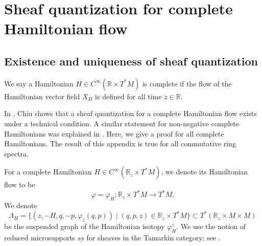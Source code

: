 \documentclass[11pt]{amsart}
\numberwithin{equation}{section}
\theoremstyle{plain}
\theoremstyle{definition}
\theoremstyle{remark}
\newcommand{\bR} { {\mathbb{R}}}
\begin{document}
\appendix
\section{Sheaf quantization for complete Hamiltonian flow}


\subsection{Existence and uniqueness of sheaf quantization}\label{appendix: existence kernel}

We say a Hamiltonian $H\in C^\infty(\bR\times T^*M )$ is complete if the flow of the Hamiltonian vector field $X_H$ is defined for all time $z\in \bR$.

In \cite{Chiu-kernel2021}, Chiu shows that a sheaf quantization for a complete Hamiltonian flow exists under a technical condition. A similar statement for non-negative complete Hamiltonians was explained in \cite[Section 2.3]{Asano-Ike-peg}. Here, we give a proof for all complete Hamiltonians. The result of this appendix is true for all commutative ring spectra.

For a complete Hamiltonian $H\in C^\infty( \bR_z\times T^*M)$, we denote its Hamiltonian flow to be 
\[\varphi=\varphi_H:\bR_z\times T^*M\to T^*M.\]
We denote
\[\Lambda_H=\{(z,-H,q,-p,\varphi_z(q,p))\mid (q,p,z)\in \bR_z\times T^*M\} \subset T^*(\bR_z\times M\times M )\]
be the suspended graph of the Hamiltonian isotopy $\varphi_H^z$. We use the notion of reduced microsupports $\underline{ss}$ for sheaves in the Tamarkin category; see \cite[Remark 5.8]{Hochschild-Kuo-Shende-Zhang}.
\end{document}
